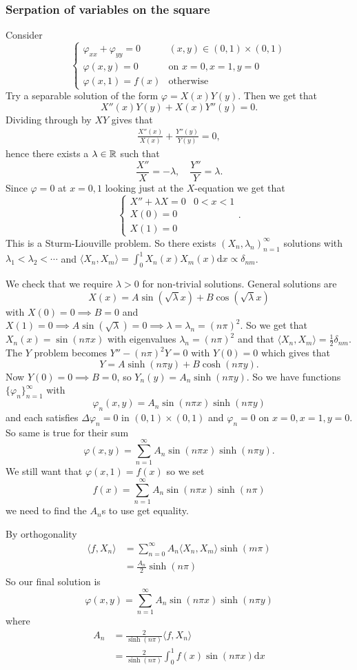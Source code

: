 \documentclass{article}
\begin{document}
\subsubsection{Serpation of variables on the square}
Consider
\[
  \begin{cases}
	  \varphi_{xx}+\varphi_{yy}=0 & (x,y)\in(0,1)\times (0,1) \\
	  \varphi(x,y)=0 & \text{on } x=0,x=1,y=0\\
	  \varphi(x,1)=f(x) & \text{otherwise}
  \end{cases}
\]
Try a separable solution of the form $ \varphi=X(x)Y(y) $. Then we get that
\[
  X''(x)Y(y)+X(x)Y''(y)=0.
\]
Dividing through by $ XY $ gives that
\begin{align*}
	\frac{X''(x)}{X(x)}+\frac{Y''(y)}{Y(y)}=0,
\end{align*}
hence there exists a $ \lambda\in\mathbb{R} $ such that
\[
	\frac{X''}X = -\lambda,\quad \frac{Y''}Y=\lambda.
\]
Since $ \varphi=0 $ at $ x=0,1 $ looking just at the $ X $-equation we get that
\[
  \begin{cases}
	  X''+\lambda X=0 & 0< x< 1\\
	  X(0)=0\\
	  X(1)=0
  \end{cases}.
\]
This is a Sturm-Liouville problem. So there exists $ (X_n,\lambda_n)^\infty_{n=1} $ solutions with $ \lambda_1<\lambda_2<\cdots $ and $ \langle X_n,X_m\rangle=\int_0^1X_n(x)X_m(x)\mathrm dx\propto \delta_{nm} $.\par
We check that we require $ \lambda>0 $ for non-trivial solutions. General solutions are
\[
	X(x)=A\sin(\sqrt{\lambda}x)+B\cos(\sqrt{\lambda}x)
\]
with $ X(0)=0\implies B=0 $ and $ X(1)=0\implies A\sin(\sqrt{\lambda})=0\implies \lambda=\lambda_n=(n\pi)^2 $. So we get that $ X_n(x)=\sin(n\pi x) $ with eigenvalues $ \lambda_n=(n\pi)^2 $ and that $ \langle X_n,X_m\rangle =\frac 12\delta_{nm} $. The $ Y $ problem becomes $ Y''-(n\pi)^2Y=0 $ with $ Y(0)=0 $ which gives that
\[
  Y=A\sinh(n\pi y)+B\cosh(n\pi y).
\]
Now $ Y(0)=0\implies B=0 $, so $ Y_n(y)=A_n\sinh(n\pi y) $. So we have functions $ \{\varphi_n\}_{n=1}^\infty $ with
\[
  \varphi_n(x,y)=A_n\sin(n\pi x)\sinh(n\pi y)
\]
and each satisfies $ \Delta\varphi_n=0 $ in $ (0,1)\times (0,1) $ and $ \varphi_n=0 $ on $ x=0,x=1,y=0 $. So same is true for their sum
\[
	\varphi(x,y)=\sum_{n=1}^\infty A_n\sin(n\pi x)\sinh(n\pi y).
\]
We still want that $ \varphi(x,1)=f(x) $ so we set
\[
	f(x)=\sum_{n=1}^\infty A_n\sin(n\pi x)\sinh(n\pi)
\]
we need to find the $ A_n $s to use get equality.\par
By orthogonality
\begin{align*}
	\langle f,X_n\rangle &= \sum_{n=0}^\infty A_n{\langle X_n,X_m\rangle}\sinh(m\pi)\\
	&= \frac{A_n}2\sinh(n\pi)
\end{align*}
So our final solution is
\[
	\varphi(x,y)=\sum_{n=1}^\infty A_n\sin(n\pi x)\sinh(n\pi y)
\]
where
\begin{align*}
	A_n &=\frac 2{\sinh(n\pi)}\langle f,X_n\rangle\\
	    &= \frac2{\sinh(n\pi)}\int_0^1f(x)\sin(n\pi x)\mathrm dx
\end{align*}
\end{document}
